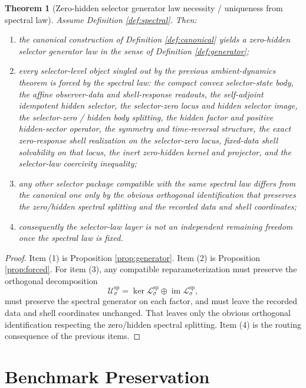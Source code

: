 \documentclass[11pt]{article}
\newcommand{\SpecSpace}[1]{\mathcal U_{#1}^{\mathrm{sp}}}
\newcommand{\SpecOp}[1]{\mathcal L_{#1}^{\mathrm{sp}}}
\newtheorem{theorem}{Theorem}
\begin{document}
\begin{theorem}[Zero-hidden selector generator law necessity / uniqueness from spectral law]
\label{thm:necessity}
Assume Definition \ref{def:spectral}. Then:
\begin{enumerate}
    \item the canonical construction of Definition \ref{def:canonical} yields a zero-hidden selector generator law in the sense of Definition \ref{def:generator};
    \item every selector-level object singled out by the previous ambient-dynamics theorem is forced by the spectral law: the compact convex selector-state body, the affine observer-data and shell-response readouts, the self-adjoint idempotent hidden selector, the selector-zero locus and hidden selector image, the selector-zero / hidden body splitting, the hidden factor and positive hidden-sector operator, the symmetry and time-reversal structure, the exact zero-response shell realization on the selector-zero locus, fixed-data shell solvability on that locus, the inert zero-hidden kernel and projector, and the selector-law coercivity inequality;
    \item any other selector package compatible with the same spectral law differs from the canonical one only by the obvious orthogonal identification that preserves the zero/hidden spectral splitting and the recorded data and shell coordinates;
    \item consequently the selector-law layer is not an independent remaining freedom once the spectral law is fixed.
\end{enumerate}
\end{theorem}

\begin{proof}
Item (1) is Proposition \ref{prop:generator}. Item (2) is Proposition \ref{prop:forced}. For item (3), any compatible reparameterization must preserve the orthogonal decomposition
\[
\SpecSpace{\sigma}
=
\ker\SpecOp{\sigma}\oplus\operatorname{im}\SpecOp{\sigma},
\]
must preserve the spectral generator on each factor, and must leave the recorded data and shell coordinates unchanged. That leaves only the obvious orthogonal identification respecting the zero/hidden spectral splitting. Item (4) is the routing consequence of the previous items.
\end{proof}

\section{Benchmark Preservation}
\end{document}
